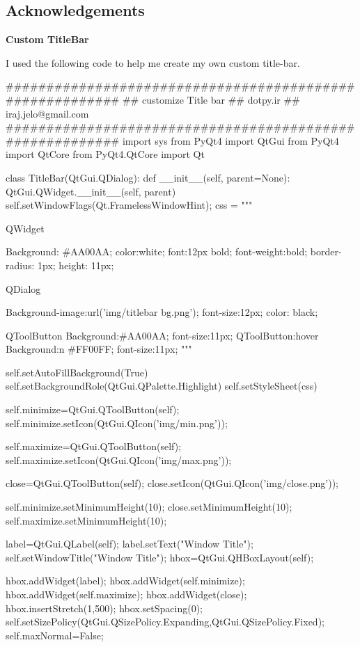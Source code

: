 \begin{python}
\section{Acknowledgements}

\textbf{Custom TitleBar}


I used the following code to help me create my own custom title-bar.

\begin{python}
#########################################################
## customize Title bar
## dotpy.ir
## iraj.jelo@gmail.com
#########################################################
import sys
from PyQt4 import QtGui
from PyQt4 import QtCore
from PyQt4.QtCore import Qt


class TitleBar(QtGui.QDialog):
    def __init__(self, parent=None):
        QtGui.QWidget.__init__(self, parent)
        self.setWindowFlags(Qt.FramelessWindowHint);
        css = """

QWidget
{
Background: #AA00AA;
color:white;
font:12px bold;
font-weight:bold;
border-radius: 1px;
height: 11px;

}
QDialog{
Background-image:url('img/titlebar bg.png');
font-size:12px;
color: black;

}
QToolButton{
Background:#AA00AA;
font-size:11px;
}
QToolButton:hover{
Background:n #FF00FF;
font-size:11px;
}
"""

        self.setAutoFillBackground(True)
        self.setBackgroundRole(QtGui.QPalette.Highlight)
        self.setStyleSheet(css) 

        self.minimize=QtGui.QToolButton(self);
        self.minimize.setIcon(QtGui.QIcon('img/min.png'));

        self.maximize=QtGui.QToolButton(self);
        self.maximize.setIcon(QtGui.QIcon('img/max.png'));

        close=QtGui.QToolButton(self);
        close.setIcon(QtGui.QIcon('img/close.png'));

        self.minimize.setMinimumHeight(10);
        close.setMinimumHeight(10);
        self.maximize.setMinimumHeight(10);

        label=QtGui.QLabel(self);
        label.setText("Window Title");
        self.setWindowTitle("Window Title");
        hbox=QtGui.QHBoxLayout(self);

        hbox.addWidget(label);
        hbox.addWidget(self.minimize);
        hbox.addWidget(self.maximize);
        hbox.addWidget(close);
        hbox.insertStretch(1,500);
        hbox.setSpacing(0);
        self.setSizePolicy(QtGui.QSizePolicy.Expanding,QtGui.QSizePolicy.Fixed);
        self.maxNormal=False;


\end{python}
\end{python}
